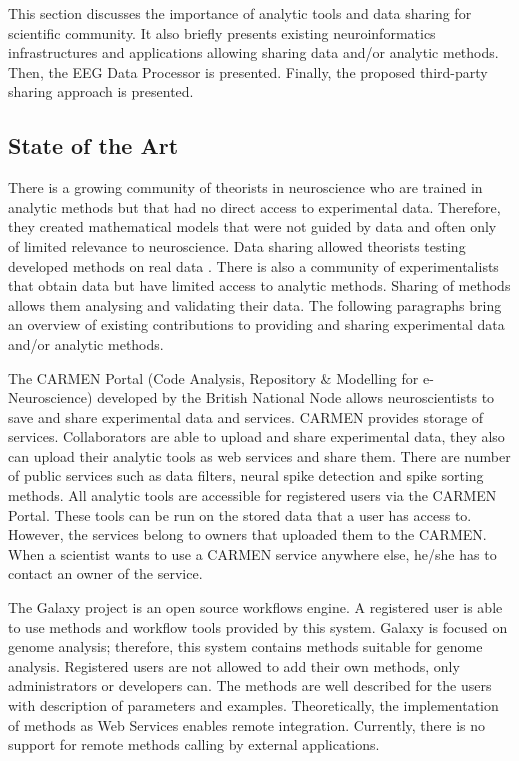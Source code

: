 \documentclass{frontiersSCNS} %
\begin{document}
This section discusses the importance of analytic tools and data sharing for scientific community. It also briefly presents existing neuroinformatics infrastructures and applications allowing sharing data and/or analytic methods. Then, the EEG Data Processor is presented. Finally, the proposed third-party sharing approach is presented. 


\subsection{State of the Art}
There is a growing community of theorists in neuroscience who are trained in analytic methods but that had no direct access to experimental data. Therefore, they created mathematical models that were not guided by data and often only of limited relevance to neuroscience. Data sharing allowed theorists testing developed methods on real data \cite{Tetters08}. There is also a community of experimentalists that obtain data but have limited access to analytic methods. Sharing of methods allows them analysing and validating their data. The following paragraphs bring an overview of existing contributions to providing and sharing experimental data and/or analytic methods.

The CARMEN Portal \cite{Watson07} (Code Analysis, Repository \& Modelling for e-Neuroscience) developed by the British National Node allows neuroscientists to save and share experimental data and services. CARMEN provides storage of services. Collaborators are able to upload and share experimental data, they also can upload their analytic tools as web services and share them. There are number of public services such as data filters, neural spike detection and spike sorting methods. All analytic tools are accessible for registered users via the CARMEN Portal. These tools can be run on the stored data that a user has access to. However, the services belong to owners that uploaded them to the CARMEN. When a scientist wants to use a CARMEN service anywhere else, he/she has to contact an owner of the service.

The Galaxy project \cite{goecks2010galaxy, blankenberg2010galaxy, giardine2005galaxy} is an open source workflows engine. A registered user is able to use methods and workflow tools provided by this system. Galaxy is focused on genome analysis; therefore, this system contains methods suitable for genome analysis. Registered users are not allowed to add their own methods, only administrators or developers can. The methods are well described for the users with description of parameters and examples. Theoretically, the implementation of methods as Web Services enables remote integration. Currently, there is no support for remote methods calling by external applications.
\end{document}
